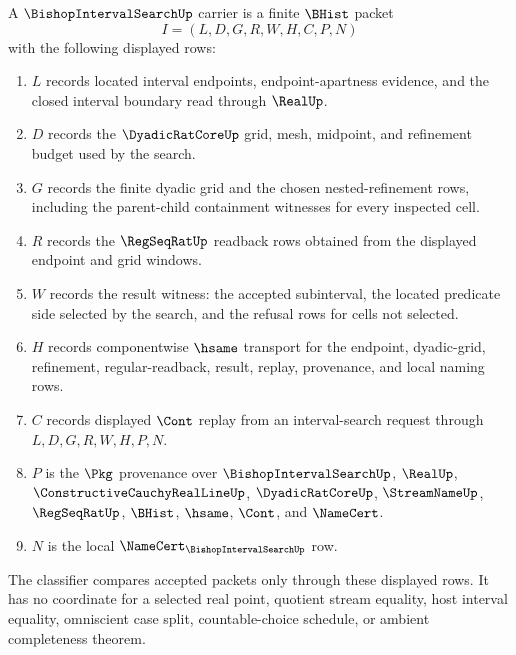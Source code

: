 \begin{definition}
\label{def:bishop-interval-search-carrier}
A $\BishopIntervalSearchUp$ carrier is a finite $\BHist$ packet
$$
I=(L,D,G,R,W,H,C,P,N)
$$
with the following displayed rows:
\begin{enumerate}
\item $L$ records located interval endpoints, endpoint-apartness evidence, and the closed interval boundary read through $\RealUp$.
\item $D$ records the $\DyadicRatCoreUp$ grid, mesh, midpoint, and refinement budget used by the search.
\item $G$ records the finite dyadic grid and the chosen nested-refinement rows, including the parent-child containment witnesses for every inspected cell.
\item $R$ records the $\RegSeqRatUp$ readback rows obtained from the displayed endpoint and grid windows.
\item $W$ records the result witness: the accepted subinterval, the located predicate side selected by the search, and the refusal rows for cells not selected.
\item $H$ records componentwise $\hsame$ transport for the endpoint, dyadic-grid, refinement, regular-readback, result, replay, provenance, and local naming rows.
\item $C$ records displayed $\Cont$ replay from an interval-search request through $L,D,G,R,W,H,P,N$.
\item $P$ is the $\Pkg$ provenance over $\BishopIntervalSearchUp$, $\RealUp$, $\ConstructiveCauchyRealLineUp$, $\DyadicRatCoreUp$, $\StreamNameUp$, $\RegSeqRatUp$, $\BHist$, $\hsame$, $\Cont$, and $\NameCert$.
\item $N$ is the local $\NameCert_{\BishopIntervalSearchUp}$ row.
\end{enumerate}
The classifier compares accepted packets only through these displayed rows. It has no coordinate for a selected real point, quotient stream equality, host interval equality, omniscient case split, countable-choice schedule, or ambient completeness theorem.
\end{definition}

